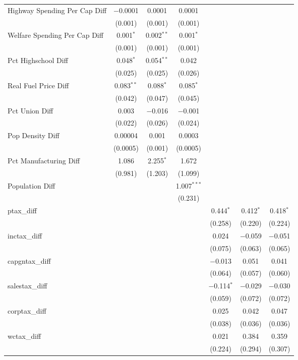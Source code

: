 \begin{table}[!htbp]
\begin{tabular}{@{\extracolsep{5pt}}lcccccc}
  Highway Spending Per Cap Diff & $-$0.0001 & 0.0001 & 0.0001 &  &  &  \\ 
  & (0.001) & (0.001) & (0.001) &  &  &  \\ 
  Welfare Spending Per Cap Diff & 0.001$^{*}$ & 0.002$^{**}$ & 0.001$^{*}$ &  &  &  \\ 
  & (0.001) & (0.001) & (0.001) &  &  &  \\ 
  Pct Highschool Diff & 0.048$^{*}$ & 0.054$^{**}$ & 0.042 &  &  &  \\ 
  & (0.025) & (0.025) & (0.026) &  &  &  \\ 
  Real Fuel Price Diff & 0.083$^{**}$ & 0.088$^{*}$ & 0.085$^{*}$ &  &  &  \\ 
  & (0.042) & (0.047) & (0.045) &  &  &  \\ 
  Pct Union Diff & 0.003 & $-$0.016 & $-$0.001 &  &  &  \\ 
  & (0.022) & (0.026) & (0.024) &  &  &  \\ 
  Pop Density Diff & 0.00004 & 0.001 & 0.0003 &  &  &  \\ 
  & (0.0005) & (0.001) & (0.0005) &  &  &  \\ 
  Pct Manufacturing Diff & 1.086 & 2.255$^{*}$ & 1.672 &  &  &  \\ 
  & (0.981) & (1.203) & (1.099) &  &  &  \\ 
  Population Diff &  &  & 1.007$^{***}$ &  &  &  \\ 
  &  &  & (0.231) &  &  &  \\ 
  ptax\_diff &  &  &  & 0.444$^{*}$ & 0.412$^{*}$ & 0.418$^{*}$ \\ 
  &  &  &  & (0.258) & (0.220) & (0.224) \\ 
  inctax\_diff &  &  &  & 0.024 & $-$0.059 & $-$0.051 \\ 
  &  &  &  & (0.075) & (0.063) & (0.065) \\ 
  capgntax\_diff &  &  &  & $-$0.013 & 0.051 & 0.041 \\ 
  &  &  &  & (0.064) & (0.057) & (0.060) \\ 
  salestax\_diff &  &  &  & $-$0.114$^{*}$ & $-$0.029 & $-$0.030 \\ 
  &  &  &  & (0.059) & (0.072) & (0.072) \\ 
  corptax\_diff &  &  &  & 0.025 & 0.042 & 0.047 \\ 
  &  &  &  & (0.038) & (0.036) & (0.036) \\ 
  wctax\_diff &  &  &  & 0.021 & 0.384 & 0.359 \\ 
  &  &  &  & (0.224) & (0.294) & (0.307) \\ 

\end{tabular}
\end{table}
